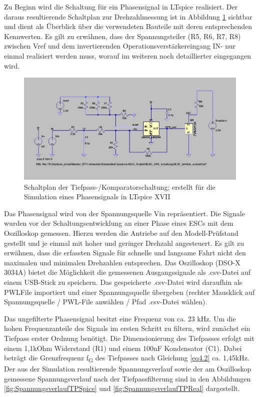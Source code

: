 Zu Beginn wird die Schaltung für ein Phasensignal in LTspice realisiert. Der daraus resultierende Schaltplan zur Drehzahlmessung ist in Abbildung \ref{fig:Schaltungsaufbau} sichtbar und dient als Überblick über die verwendeten Bauteile mit deren entsprechenden Kennwerten. Es gilt zu erwähnen, dass der Spannungsteiler (R5, R6, R7, R8) zwischen Vref und dem invertierenden Operationsverstärkereingang IN- nur einmal realisiert werden muss, worauf im weiteren noch detaillierter eingegangen wird.

\begin{figure}[H] %
\includegraphics[width=.95\textwidth]{sec4/images/Schaltungsaufbau} 
\centering
\captionsetup{width=.95\textwidth}
\caption[Schaltplan der Tiefpass-/Komparatorschaltung aus LTspice XVII]{Schaltplan der Tiefpass-/Komparatorschaltung; erstellt für die Simulation eines Phasensignals in LTspice XVII}\centering
\label{fig:Schaltungsaufbau}
\end{figure}

Das Phasensignal wird von der Spannungsquelle Vin repräsentiert. Die Signale wurden vor der Schaltungsentwicklung an einer Phase eines ESCs mit dem Oszilloskop gemessen. Hierzu werden die Antriebe auf den Modell-Prüfstand gestellt und je einmal mit hoher und geringer Drehzahl angesteuert. Es gilt zu erwähnen, dass die erfassten Signale für schnelle und langsame Fahrt nicht den maximalen und minimalen Drehzahlen entsprechen. Das Oszilloskop (DSO-X 3034A) bietet die Möglichkeit die gemessenen Ausgangssignale als .csv-Datei auf einem USB-Stick zu speichern. Das gespeicherte .csv-Datei wird daraufhin als \ac{PWLFile} importiert und einer Spannungsquelle übergeben (rechter Mausklick auf Spannungsquelle / PWL-File anwählen / Pfad .csv-Datei wählen).\vspace{11pt}

Das ungefilterte Phasensignal besitzt eine Frequenz von ca. 23 kHz. Um die hohen Frequenzanteile des Signals im ersten Schritt zu filtern, wird zunächst ein Tiefpass erster Ordnung benötigt. Die Dimensionierung des Tiefpasses erfolgt mit einem 1,1kOhm Widerstand (R1) und einem 100nF Kondensator (C1). Dabei beträgt die Grenzfrequenz f\textsubscript{G} des Tiefpasses nach Gleichung \ref{eq4.2} ca. 1,45kHz. Der aus der Simulation resultierende Spannungsverlauf sowie der am Oszilloskop gemessene Spannungsverlauf nach der Tiefpassfilterung sind in den Abbildungen \ref{fig:SpannungsverlaufTPSpice} und \ref{fig:SpannungsverlaufTPReal} dargestellt.\vspace{11pt}

